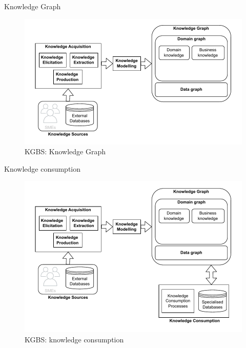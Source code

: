 \begin{frame}{Knowledge Graph}

    \begin{figure} [H]
        \begin{center}
            \includegraphics[scale=0.6]{images/KGBS-knowledge-modelling-kg.pdf} 
            \caption{KGBS: Knowledge Graph} 
        \end{center}
    \end{figure}

\end{frame}

\begin{frame}{Knowledge consumption}

    \begin{figure} [H]
        \begin{center}
            \includegraphics[scale=0.6]{images/KGBS-knowledge-consumption.pdf} 
            \caption{KGBS: knowledge consumption} 
        \end{center}
    \end{figure}

\end{frame}

